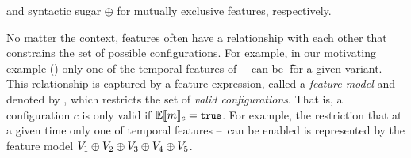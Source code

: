and syntactic sugar $\oplus$ for mutually exclusive features, respectively.
%


No matter the context, features often have a relationship with each other that
constrains the set of possible configurations. For example, in our motivating example ()
only one of the
temporal features of \vOne--\vFive\ can be \t\ for a given variant. This
relationship is captured by a feature expression, called a \emph{feature model}
and denoted by \fModel, which restricts the set of \emph{valid configurations}.
That is, a configuration $c$ is only valid if $\fSem{\fModel}=\t$.
%
For example, the restriction that at a given time only one of temporal features
\vOne--\vFive\ 
can be enabled is represented by the feature model
$\vOne \oplus \vTwo \oplus \vThree \oplus \vFour \oplus \vFive$.

